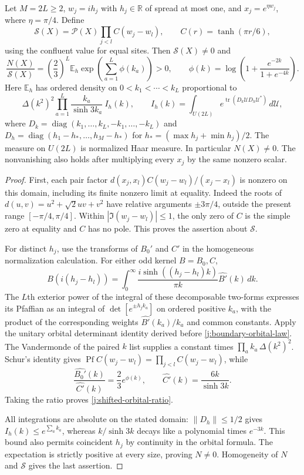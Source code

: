 \begin{lemma}\label{j:shifted-nonvanishing}
Let $M=2L\ge2$, $w_j=i h_j$ with $h_j\in\mathbb R$ of spread at
most one, and $x_j=e^{\eta w_j}$, where $\eta=\pi/4$. Define
\[
 \mathcal S(X)=\mathcal P(X)\prod_{j<l}C(w_j-w_l),
 \qquad C(r)=\tanh(\pi r/6),
\]
using the confluent value for equal sites. Then $\mathcal S(X)\ne0$
and
\begin{equation}\label{j:shifted-orbital-ratio}
 \frac{N(X)}{\mathcal S(X)}
 =\left(\frac23\right)^L
   \mathbb E_h\exp\!\left(\sum_{a=1}^L\phi(k_a)\right)>0,
 \qquad
 \phi(k)=\log\left(1+\frac{e^{-2k}}{1+e^{-4k}}\right).
\end{equation}
Here $\mathbb E_h$ has ordered density on $0<k_1<\cdots<k_L$
proportional to
\[
 \Delta(k^2)^2\prod_{a=1}^L\frac{k_a}{\sinh3k_a}\ I_h(k),
 \qquad
 I_h(k)=\int_{U(2L)}
     e^{\operatorname{tr}(D_k\mathcal U D_h\mathcal U^*)}\,d\mathcal U,
\]
where $D_k=\operatorname{diag}(k_1,\ldots,k_L,-k_1,\ldots,-k_L)$
and $D_h=\operatorname{diag}(h_1-h_*,\ldots,h_M-h_*)$ for
$h_*=(\max h_j+\min h_j)/2$. The measure on $U(2L)$ is normalized
Haar measure. In particular $N(X)\ne0$. The nonvanishing also holds
after multiplying every $x_j$ by the same nonzero scalar.
\end{lemma}

\begin{proof}
First, each pair factor
$d(x_j,x_l)C(w_j-w_l)/(x_j-x_l)$ is nonzero on this domain,
including its finite nonzero limit at equality. Indeed the roots of
$d(u,v)=u^2+\sqrt2uv+v^2$ have relative arguments
$\pm3\pi/4$, outside the present range $[-\pi/4,\pi/4]$.
Within $|\Im(w_j-w_l)|\le1$, the only zero of $C$ is the simple
zero at equality and $C$ has no pole. This proves the assertion
about $\mathcal S$.

For distinct $h_j$, use the transforms of $B_0'$ and $C'$ in the
homogeneous normalization calculation. For either odd kernel
$B=B_0,C$,
\[
 B(i(h_j-h_l))
 =\int_0^\infty
   \frac{i\sinh((h_j-h_l)k)}{\pi k}\widehat{B'}(k)\,dk.
\]
The $L$th exterior power of the integral of these decomposable
two-forms expresses its Pfaffian as an integral of
$\det[e^{\pm h_j k_a}]$ on ordered positive $k_a$, with the product
of the corresponding weights $\widehat{B'}(k_a)/k_a$ and common
constants. Apply the unitary orbital determinant identity derived
before \eqref{j:boundary-orbital-law}. The Vandermonde of the paired
$k$ list supplies a constant times
$\prod_a k_a\,\Delta(k^2)^2$. Schur's identity gives
$\operatorname{Pf}C(w_j-w_l)=\prod_{j<l}C(w_j-w_l)$, while
\[
 \frac{\widehat{B_0'}(k)}{\widehat{C'}(k)}
 =\frac23 e^{\phi(k)},\qquad
 \widehat{C'}(k)=\frac{6k}{\sinh3k}.
\]
Taking the ratio proves \eqref{j:shifted-orbital-ratio}.

All integrations are absolute on the stated domain:
$\|D_h\|\le1/2$ gives $I_h(k)\le e^{\sum_a k_a}$, whereas
$k/\sinh3k$ decays like a polynomial times $e^{-3k}$.
This bound also permits coincident $h_j$ by continuity in the
orbital formula. The expectation is strictly positive at every
size, proving $N\ne0$. Homogeneity of $N$ and $\mathcal S$ gives
the last assertion.
\end{proof}

